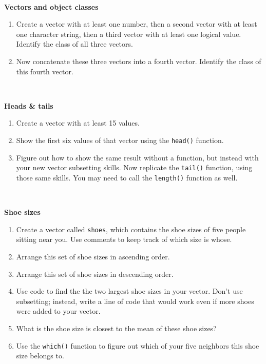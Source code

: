 \documentclass[]{book}
\begin{document}
~

\textbf{Vectors and object classes}

\begin{enumerate}
\def\labelenumi{\arabic{enumi}.}
\setcounter{enumi}{7}
\item
  Create a vector with at least one number, then a second vector with at least one character string, then a third vector with at least one logical value. Identify the class of all three vectors.
\item
  Now concatenate these three vectors into a fourth vector. Identify the class of this fourth vector.
\end{enumerate}

~

\textbf{Heads \& tails}

\begin{enumerate}
\def\labelenumi{\arabic{enumi}.}
\setcounter{enumi}{9}
\item
  Create a vector with at least 15 values.
\item
  Show the first six values of that vector using the \texttt{head()} function.
\item
  Figure out how to show the same result without a function, but instead with your new vector subsetting skills.
  Now replicate the \texttt{tail()} function, using those same skills. You may need to call the \texttt{length()} function as well.
\end{enumerate}

~

\textbf{Shoe sizes}

\begin{enumerate}
\def\labelenumi{\arabic{enumi}.}
\setcounter{enumi}{12}
\item
  Create a vector called \texttt{shoes}, which contains the shoe sizes of five people sitting near you. Use comments to keep track of which size is whose.
\item
  Arrange this set of shoe sizes in ascending order.
\item
  Arrange this set of shoe sizes in descending order.
\item
  Use code to find the the two largest shoe sizes in your vector. Don't use subsetting; instead, write a line of code that would work even if more shoes were added to your vector.
\item
  What is the shoe size is closest to the mean of these shoe sizes?
\item
  Use the \texttt{which()} function to figure out which of your five neighbors this shoe size belongs to.
\end{enumerate}
\end{document}
